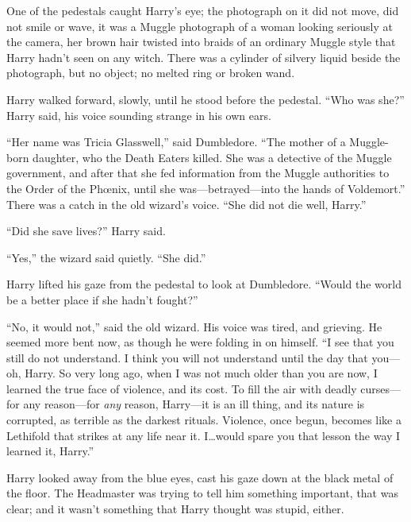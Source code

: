 One of the pedestals caught Harry’s eye; the photograph on it did not move, did not smile or wave, it was a Muggle photograph of a woman looking seriously at the camera, her brown hair twisted into braids of an ordinary Muggle style that Harry hadn’t seen on any witch. There was a cylinder of silvery liquid beside the photograph, but no object; no melted ring or broken wand.

Harry walked forward, slowly, until he stood before the pedestal. “Who was she?” Harry said, his voice sounding strange in his own ears.

“Her name was Tricia Glasswell,” said Dumbledore. “The mother of a Muggle-born daughter, who the Death Eaters killed. She was a detective of the Muggle government, and after that she fed information from the Muggle authorities to the Order of the Phœnix, until she was—betrayed—into the hands of Voldemort.” There was a catch in the old wizard’s voice. “She did not die well, Harry.”

“Did she save lives?” Harry said.

“Yes,” the wizard said quietly. “She did.”

Harry lifted his gaze from the pedestal to look at Dumbledore. “Would the world be a better place if she hadn’t fought?”

“No, it would not,” said the old wizard. His voice was tired, and grieving. He seemed more bent now, as though he were folding in on himself. “I see that you still do not understand. I think you will not understand until the day that you—oh, Harry. So very long ago, when I was not much older than you are now, I learned the true face of violence, and its cost. To fill the air with deadly curses—for any reason—for \emph{any} reason, Harry—it is an ill thing, and its nature is corrupted, as terrible as the darkest rituals. Violence, once begun, becomes like a Lethifold that strikes at any life near it. I…would spare you that lesson the way I learned it, Harry.”

Harry looked away from the blue eyes, cast his gaze down at the black metal of the floor. The Headmaster was trying to tell him something important, that was clear; and it wasn’t something that Harry thought was stupid, either.

